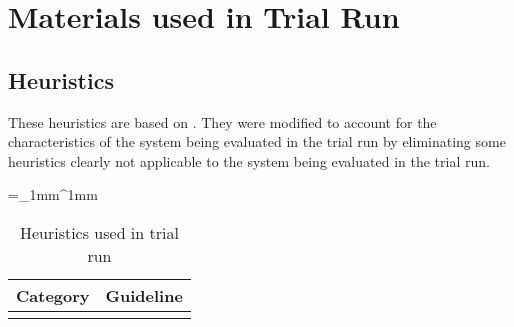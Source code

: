\chapter{Materials used in Trial Run}
\label{app:trial}

\section{Heuristics}
These heuristics are based on \citet{Oztekin2010}. They were modified to account for the characteristics of the system being evaluated in the trial run by eliminating some heuristics clearly not applicable to the system being evaluated in the trial run.

\begin{singlespace}
		\tabulinesep=_1mm^1mm
		\vspace{0.5cm}
\begin{longtabu} to \textwidth {lX[1, p]}
			\caption{Heuristics used in trial run}\\
			\toprule
			\textbf{Category} & \textbf{Guideline} \\
			\midrule
		\endfirsthead
		
			\bottomrule
		\endlastfoot
		

\end{longtabu}
\end{singlespace}
